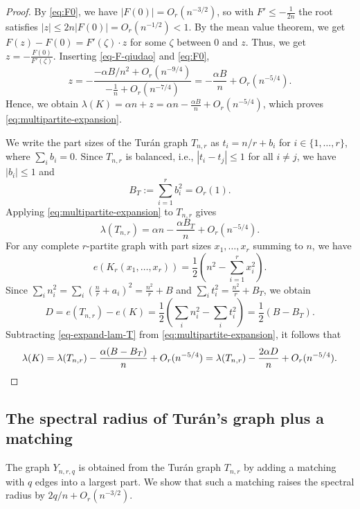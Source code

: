\documentclass[11pt,a4paper]{article}
\theoremstyle{definition}
\theoremstyle{plain}
\renewcommand{\le}{\leqslant}
\begin{document}
\begin{proof}
 By \eqref{eq:F0}, we have $|F(0)|=O_r(n^{-3/2})$, so with
$F'\le-\tfrac1{2n}$ the root satisfies $|z|\le 2n|F(0)|=O_r(n^{-1/2})<1$. By the
mean value theorem, we get 
$F(z)-F(0)= F'(\zeta) \cdot z$  for some $\zeta$ between $0$ and $z$. Thus, we get  
$z=- \frac{F(0)}{F'(\zeta)}$. 
Inserting \eqref{eq-F-qiudao} and \eqref{eq:F0},
\[
        z=-\frac{-\alpha B/n^2+O_r(n^{-9/4})}{-\tfrac1n+O_r(n^{-7/4})}
         =-\frac{\alpha B}{n}+O_r(n^{-5/4}).
\]
Hence, we obtain 
$    \lambda(K)=\alpha n+z=\alpha n-\frac{\alpha B}{n}+O_r(n^{-5/4})$, 
which proves \eqref{eq:multipartite-expansion}.

\medskip
We write the part sizes of the Tur\'{a}n graph $T_{n,r}$ as 
$t_i=n/r +b_i$ for $i\in \{1,\ldots ,r\}$, where $\sum_i b_i=0$. Since $T_{n,r}$ is balanced, i.e., $|t_i-t_j| \le 1$ for all $i\neq j$, we have $|b_i|\le 1$ and
$$B_T:=\sum_{i=1}^r b_i^2=O_r(1). $$ 
Applying \eqref{eq:multipartite-expansion}
to $T_{n,r}$ gives 
\begin{equation}
        \lambda(T_{n,r})=\alpha n-\frac{\alpha B_T}{n}+O_r(n^{-5/4}).
        \label{eq-expand-lam-T}
\end{equation}
For any complete $r$-partite graph with part sizes $x_1,\ldots ,x_r$ summing to $n$, we have  
$$ e(K_r(x_1,\ldots ,x_r))=\frac12 
\left(n^2-\sum_{i=1}^r x_i^2\right).$$
Since 
$\sum_i n_i^2= \sum_i (\frac{n}{r} +a_i)^2 = \tfrac{n^2}{r}+B$ and $\sum_i t_i^2=\tfrac{n^2}{r}+B_T$, we obtain 
\begin{equation} \label{eq-DB}
        D=e(T_{n,r})-e(K)=\frac12\left(\sum_i n_i^2-\sum_i t_i^2\right)
        =\frac12(B-B_T).
\end{equation}
Subtracting \eqref{eq-expand-lam-T} from \eqref{eq:multipartite-expansion}, it follows that 
\[
        \lambda(K)=\lambda(T_{n,r})-\frac{\alpha(B-B_T)}{n}+O_r(n^{-5/4})
                 =\lambda(T_{n,r})-\frac{2\alpha D}{n}+O_r(n^{-5/4}). \qedhere 
\]
\end{proof}





\subsection{The spectral radius of Tur\'{a}n's graph plus a matching}

The graph $Y_{n,r,q}$ is obtained from the Tur\'{a}n graph $T_{n,r}$ by adding a matching with $q$ edges into a largest part. We show that such a matching raises the spectral radius by $2q/n+O_r(n^{-3/2})$.
\end{document}
